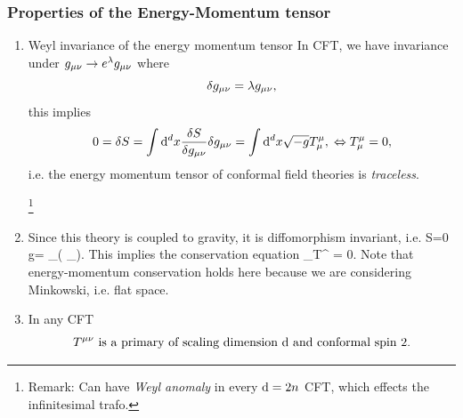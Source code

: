 \subsubsection{Properties of the Energy-Momentum tensor}
\begin{enumerate}
	\item \begin{mybox}{Weyl invariance of the energy momentum tensor}
		In CFT, we have invariance under $g_{\mu \nu}\rightarrow e^\lambda g_{\mu \nu}$ where
		\begin{equation}
		\delta g_{\mu \nu} = \lambda g_{\mu \nu},
		\end{equation}
		this implies
		\begin{equation}
		0= \delta S = \int \mathrm{d}^d x \frac{\delta S}{\delta g_{\mu \nu}}\delta g_{\mu \nu} = \int \mathrm{d}^d x \sqrt{-g} T^\mu_\mu, \; \Leftrightarrow T^\mu_\mu =0,
		\end{equation}
		i.e. the energy momentum tensor of conformal field theories is \emph{traceless}.
	\end{mybox}\footnote{Remark: Can have \emph{Weyl anomaly} in every $\mathrm{d} =2n$ CFT, which effects the infinitesimal trafo.}
\item Since this theory is coupled to gravity, it is diffomorphism invariant, i.e.
\be 
\label{eq:cftDiffeomorphismInvariance}
\delta S=0  \delta g\munu= \partial_{(\mu} \xi_{\nu)}.
\ee 
This implies the conservation equation
\be 
\partial_\mu T^{\mu \nu} = 0.
\ee 
Note that energy-momentum conservation holds here because we are considering Minkowski, i.e. flat space.
\item 
\begin{mybox}{}
	In any CFT
	\begin{equation}
	T^{\mu \nu} \text{ is a primary of scaling dimension $\mathrm{d}$ and conformal spin }2.
	\end{equation}
\end{mybox}
\end{enumerate}
